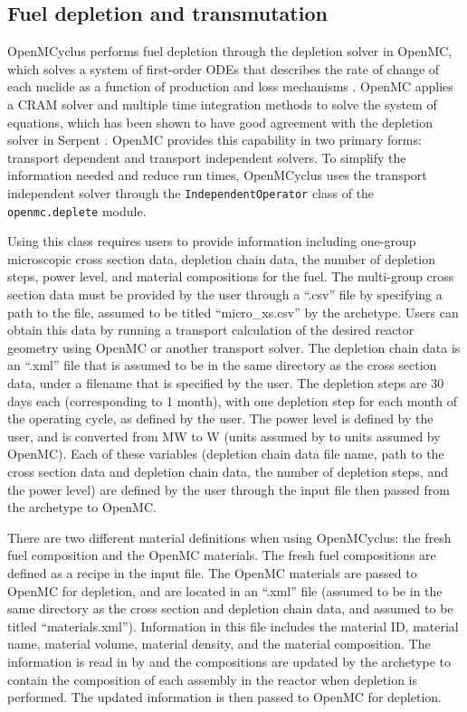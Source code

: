 \subsection{Fuel depletion and transmutation} \label{sec:transmute}
OpenMCyclus performs fuel depletion through  
the depletion solver in OpenMC, which solves a system 
of first-order ODEs that describes 
the rate of change of each nuclide as a function of production and loss 
mechanisms \cite{romano_depletion_2021}. OpenMC applies a \gls{CRAM} solver 
and multiple time integration methods to solve the system of equations, which 
has been shown to have good agreement with the depletion solver in Serpent 
\cite{romano_depletion_2021}. OpenMC provides this capability in two primary 
forms: transport dependent and transport independent solvers. To simplify 
the information needed and reduce run times, OpenMCyclus uses the transport 
independent solver through the \texttt{IndependentOperator} class of the 
\texttt{openmc.deplete} module. 

Using this class requires users to provide information including 
one-group microscopic cross section data, depletion chain data, the 
number of depletion steps, 
power level, and material compositions for the fuel. The multi-group 
cross section data must be provided by the user through a ``.csv'' file by 
specifying a path to the file, assumed to be titled ``micro\_xs.csv'' by the 
archetype. Users can obtain this data by running a transport calculation 
of the desired reactor geometry using OpenMC or another transport solver. 
The depletion chain data is an ``.xml'' file that is assumed to be in the 
same directory as the cross section data, under a filename that is specified 
by the user.
The depletion steps are 30 days each (corresponding to 1 month), 
with one depletion step for each month of the operating cycle, as defined by 
the user. The power level is defined by the user, and is converted from 
MW to W (units assumed by \Cyclus to units assumed by OpenMC). Each of these 
variables (depletion chain data file name, path to the cross section data and 
depletion chain data, the number of depletion steps, and the power level) are 
defined by the user through the \Cyclus input file then passed from the archetype 
to OpenMC. 

There are two different material definitions when using OpenMCyclus:
the fresh fuel composition and the OpenMC materials. The fresh fuel 
compositions are defined as a recipe in the \Cyclus input file. 
The OpenMC materials are passed to OpenMC for depletion, and are 
located in an ``.xml'' file 
(assumed to be in the same directory as the cross section and depletion 
chain data, and assumed to be titled ``materials.xml''). Information in 
this file includes the material ID, material name, material volume, material 
density, and the material composition. The information is 
read in by \Cyclus and the compositions are updated by the archetype to 
contain the composition of each assembly in the reactor when depletion is 
performed. The updated information is then passed to
OpenMC for depletion. 

